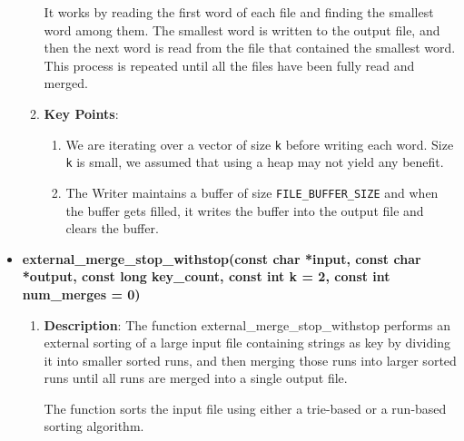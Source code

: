 \documentclass{article}
\begin{document}
\begin{itemize}
\begin{enumerate}[label = \star]
                    It works by reading the first word of each file and finding the smallest word among them. The smallest word is written to the output file, and then the next word is read from the file that contained the smallest word. This process is repeated until all the files have been fully read and merged. 
                    \item \textbf{Key Points}: 
                        \begin{enumerate}
                            \item We are iterating over a vector of size \verb|k| before writing each word. Size \verb|k| is small, we assumed that using a heap may not yield any benefit.
                            \item The Writer maintains a buffer of size \verb|FILE_BUFFER_SIZE| and when the buffer gets filled, it writes the buffer into the output file and clears the buffer.
                        \end{enumerate}
                \end{enumerate}
            \item \textbf{external\_merge\_stop\_withstop(const char *input, const char *output,
                                 const long key\_count, const int k = 2,
                                 const int num\_merges = 0)}
                \begin{enumerate}[label=\star]
                    \item \textbf{Description}: The function external\_merge\_stop\_withstop performs an external sorting of a large input file containing strings as key by dividing it into smaller sorted runs, and then merging those runs into larger sorted runs until all runs are merged into a single output file.  
                    
                    The function sorts the input file using either a trie-based or a run-based sorting algorithm.
                    

\end{enumerate}
\end{itemize}
\end{document}
